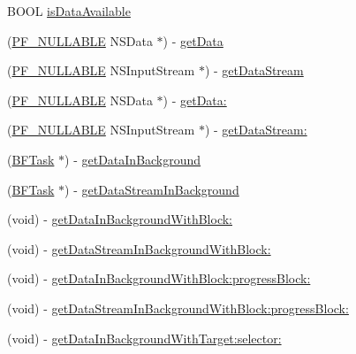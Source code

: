  \begin{DoxyCompactItemize}
\item 
B\+O\+O\+L \hyperlink{interface_p_f_file_a097e8a889aaafc477ace9ba9fa607c54}{is\+Data\+Available}
\item 
(\hyperlink{_p_f_nullability_8h_a528d97a96c5fb279a45c378f5657fca2}{P\+F\+\_\+\+N\+U\+L\+L\+A\+B\+L\+E} N\+S\+Data $\ast$) -\/ \hyperlink{interface_p_f_file_a3ebfa05ef8b5f465313cdf5b5f0a305c}{get\+Data}
\item 
(\hyperlink{_p_f_nullability_8h_a528d97a96c5fb279a45c378f5657fca2}{P\+F\+\_\+\+N\+U\+L\+L\+A\+B\+L\+E} N\+S\+Input\+Stream $\ast$) -\/ \hyperlink{interface_p_f_file_ab7a062ad25457387959c2ac5bb7838af}{get\+Data\+Stream}
\item 
(\hyperlink{_p_f_nullability_8h_a528d97a96c5fb279a45c378f5657fca2}{P\+F\+\_\+\+N\+U\+L\+L\+A\+B\+L\+E} N\+S\+Data $\ast$) -\/ \hyperlink{interface_p_f_file_a6b6292c101b4bb5646713db0c795cfe5}{get\+Data\+:}
\item 
(\hyperlink{_p_f_nullability_8h_a528d97a96c5fb279a45c378f5657fca2}{P\+F\+\_\+\+N\+U\+L\+L\+A\+B\+L\+E} N\+S\+Input\+Stream $\ast$) -\/ \hyperlink{interface_p_f_file_a8f0c2a44cb9bf11cc8a1a72091724b0e}{get\+Data\+Stream\+:}
\item 
(\hyperlink{interface_b_f_task}{B\+F\+Task} $\ast$) -\/ \hyperlink{interface_p_f_file_afa838c8cd04d76127d2fd089a1ab5def}{get\+Data\+In\+Background}
\item 
(\hyperlink{interface_b_f_task}{B\+F\+Task} $\ast$) -\/ \hyperlink{interface_p_f_file_ada0c56887e39c7c2a4dec3cb85e3dcde}{get\+Data\+Stream\+In\+Background}
\item 
(void) -\/ \hyperlink{interface_p_f_file_a9cc27e24f952c4f1e589442fee9e0d01}{get\+Data\+In\+Background\+With\+Block\+:}
\item 
(void) -\/ \hyperlink{interface_p_f_file_a4bfc494366b2c7a8cb56f50d3c7cc37b}{get\+Data\+Stream\+In\+Background\+With\+Block\+:}
\item 
(void) -\/ \hyperlink{interface_p_f_file_ab8e4ad2fe46274a6205a08e0e34bc2fb}{get\+Data\+In\+Background\+With\+Block\+:progress\+Block\+:}
\item 
(void) -\/ \hyperlink{interface_p_f_file_a30c2bad5ec70a9b274513f9fb933306f}{get\+Data\+Stream\+In\+Background\+With\+Block\+:progress\+Block\+:}
\item 
(void) -\/ \hyperlink{interface_p_f_file_a0aaf2e5e01ef1b72ad0a4c1f4b5b0189}{get\+Data\+In\+Background\+With\+Target\+:selector\+:}
\end{DoxyCompactItemize}


